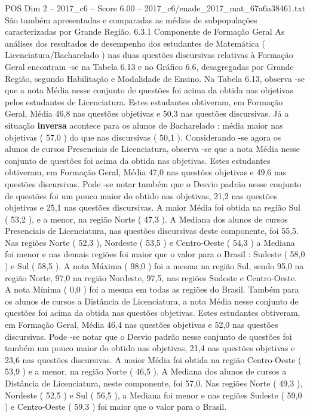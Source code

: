 \begin{textsample}{POS Dim 2 – 2017\_c6 – Score 6.00 – 2017\_c6/enade\_2017\_mat\_67a6a38461.txt}
São também apresentadas e comparadas as médias de subpopulações caracterizadas por Grande Região. 6.3.1 Componente de Formação Geral As análises dos resultados de desempenho dos estudantes de Matemática ( Licenciatura/Bacharelado ) nas duas questões discursivas relativas à Formação Geral encontram -se na Tabela 6.13 e no Gráfico 6.6, desagregadas por Grande Região, segundo Habilitação e Modalidade de Ensino.
Na Tabela 6.13, observa -se que a nota Média nesse conjunto de questões foi acima da obtida nas objetivas pelos estudantes de Licenciatura.
Estes estudantes obtiveram, em Formação Geral, Média 46,8 nas questões objetivas e 50,3 nas questões discursivas.
Já a situação \textbf{inversa} acontece para os alunos de Bacharelado : média maior nas objetivas ( 57,0 ) do que nas discursivas ( 50,1 ).
Considerando -se agora os alunos de cursos Presenciais de Licenciatura, observa -se que a nota Média nesse conjunto de questões foi acima da obtida nas objetivas.
Estes estudantes obtiveram, em Formação Geral, Média 47,0 nas questões objetivas e 49,6 nas questões discursivas.
Pode -se notar também que o Desvio padrão nesse conjunto de questões foi um pouco maior do obtido nas objetivas, 21,2 nas questões objetivas e 25,1 nas questões discursivas.
A maior Média foi obtida na região Sul ( 53,2 ), e a menor, na região Norte ( 47,3 ).
A Mediana dos alunos de cursos Presenciais de Licenciatura, nas questões discursivas deste componente, foi 55,5.
Nas regiões Norte ( 52,3 ), Nordeste ( 53,5 ) e Centro-Oeste ( 54,3 ) a Mediana foi menor e nas demais regiões foi maior que o valor para o Brasil : Sudeste ( 58,0 ) e Sul ( 58,5 ).
A nota Máxima ( 98,0 ) foi a mesma na região Sul, sendo 95,0 na região Norte, 97,0 na região Nordeste, 97,5, nas regiões Sudeste e Centro-Oeste.
A nota Mínima ( 0,0 ) foi a mesma em todas as regiões do Brasil.
Também para os alunos de cursos a Distância de Licenciatura, a nota Média nesse conjunto de questões foi acima da obtida nas questões objetivas.
Estes estudantes obtiveram, em Formação Geral, Média 46,4 nas questões objetivas e 52,0 nas questões discursivas.
Pode -se notar que o Desvio padrão nesse conjunto de questões foi também um pouco maior do obtido nas objetivas, 21,4 nas questões objetivas e 23,6 nas questões discursivas.
A maior Média foi obtida na região Centro-Oeste ( 53,9 ) e a menor, na região Norte ( 46,5 ).
A Mediana dos alunos de cursos a Distância de Licenciatura, neste componente, foi 57,0.
Nas regiões Norte ( 49,3 ), Nordeste ( 52,5 ) e Sul ( 56,5 ), a Mediana foi menor e nas regiões Sudeste ( 59,0 ) e Centro-Oeste ( 59,3 ) foi maior que o valor para o Brasil.

\end{textsample}
